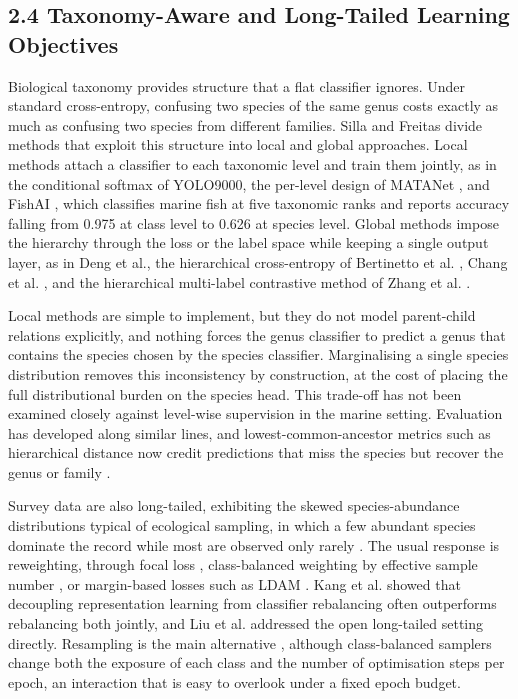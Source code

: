 \documentclass[preprint,12pt]{elsarticle}
\begin{document}
\subsection*{2.4 Taxonomy-Aware and Long-Tailed Learning
Objectives}\label{taxonomy-aware-and-long-tailed-learning-objectives}

Biological taxonomy provides structure that a flat classifier ignores.
Under standard cross-entropy, confusing two species of the same genus
costs exactly as much as confusing two species from different families.
Silla and Freitas \cite{ref23} divide methods
that exploit this structure into local and global approaches. Local
methods attach a classifier to each taxonomic level and train them
jointly, as in the conditional softmax of
YOLO9000\cite{ref59}, the per-level design of
MATANet \cite{ref26}, and FishAI
\cite{ref60} , which classifies marine fish at
five taxonomic ranks and reports accuracy falling from 0.975 at class
level to 0.626 at species level. Global methods impose the hierarchy
through the loss or the label space while keeping a single output layer,
as in Deng et al.\cite{ref61}, the hierarchical
cross-entropy of Bertinetto et al. \cite{ref24},
Chang et al. \cite{ref32}, and the hierarchical
multi-label contrastive method of Zhang et al.
\cite{ref62}.

Local methods are simple to implement, but they do not model
parent-child relations explicitly, and nothing forces the genus
classifier to predict a genus that contains the species chosen by the
species classifier\cite{ref23}. Marginalising a
single species distribution removes this inconsistency by construction,
at the cost of placing the full distributional burden on the species
head. This trade-off has not been examined closely against level-wise
supervision in the marine setting. Evaluation has developed along
similar lines, and lowest-common-ancestor metrics such as hierarchical
distance now credit predictions that miss the species but recover the
genus or family \cite{ref24}
\cite{ref30}
\cite{ref61}.

Survey data are also long-tailed, exhibiting the skewed
species-abundance distributions typical of ecological sampling, in which
a few abundant species dominate the record while most are observed only
rarely \cite{ref12}
\cite{ref15}. The usual response is reweighting,
through focal loss \cite{ref63}, class-balanced
weighting by effective sample number
\cite{ref14}, or margin-based losses such as
LDAM \cite{ref64}. Kang et al.
\cite{ref65} showed that decoupling
representation learning from classifier rebalancing often outperforms
rebalancing both jointly, and Liu et al.
\cite{ref16} addressed the open long-tailed
setting directly. Resampling is the main alternative
\cite{ref15}, although class-balanced samplers
change both the exposure of each class and the number of optimisation
steps per epoch, an interaction that is easy to overlook under a fixed
epoch budget.
\end{document}
